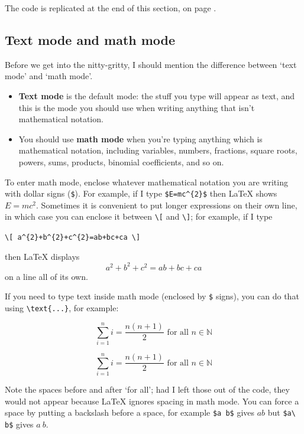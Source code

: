 \vspace{-15pt}
The code is replicated at the end of this section, on page \pageref{pTeXTemplate}.

\newpage
\subsection*{Text mode and math mode}
Before we get into the nitty-gritty, I should mention the difference between `text mode' and `math mode'.

\begin{itemize}
\item \textbf{Text mode} is the default mode: the stuff you type will appear as text, and this is the mode you should use when writing anything that isn't mathematical notation.
\item You should use \textbf{math mode} when you're typing anything which is mathematical notation, including variables, numbers, fractions, square roots, powers, sums, products, binomial coefficients, and so on.
\end{itemize}

To enter math mode, enclose whatever mathematical notation you are writing with dollar signs (\texttt{\${}}). For example, if I type \lstinline|$E=mc^{2}$| then \LaTeX{} shows $E=mc^2$. Sometimes it is convenient to put longer expressions on their own line, in which case you can enclose it between \lstinline|\[| and \lstinline|\]|; for example, if I type
\begin{center}\lstinline|\[ a^{2}+b^{2}+c^{2}=ab+bc+ca \]|\end{center}
then \LaTeX{} displays \[ a^{2}+b^{2}+c^{2}=ab+bc+ca \] on a line all of its own.

If you need to type text inside math mode (enclosed by \texttt{\$} signs), you can do that using \lstinline|\text{...}|, for example:

\begin{texcodeleft}[1]
\[ \sum_{i=1}^n i = \frac{n(n+1)}{2} \text{ for all } n \in \mathbb{N} \]
\end{texcodeleft}

\begin{texcoderight}[1]
\[ \sum_{i=1}^n i = \frac{n(n+1)}{2} \text{ for all } n \in \mathbb{N} \]
\end{texcoderight}

Note the spaces before and after `for all'; had I left those out of the code, they would not appear because \LaTeX{} ignores spacing in math mode. You can force a space by putting a backslash before a space, for example \lstinline|$a b$| gives $a b$ but \lstinline|$a\ b$| gives $a\ b$.

